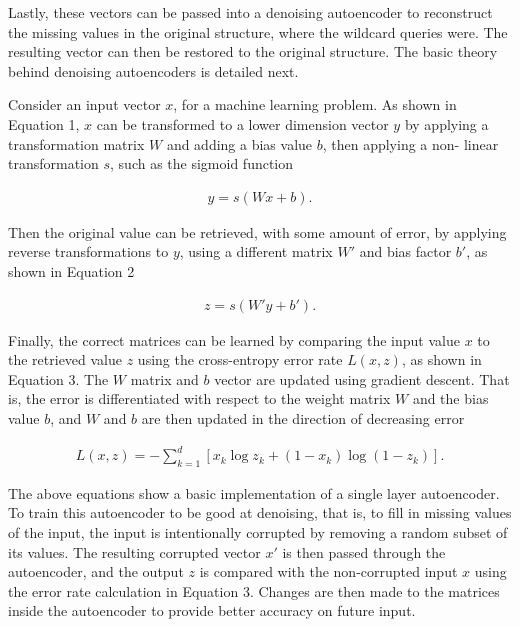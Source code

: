 \documentclass{sig-alternate}
\begin{document}
Lastly, these vectors can be passed into a denoising autoencoder to reconstruct the missing values
in the original structure, where the wildcard queries were. The resulting vector can then be restored
to the original structure. The basic theory behind denoising autoencoders is detailed next.

Consider an input vector $x$, for a machine learning problem.
As shown in Equation 1, $x$ can be transformed to a lower dimension
vector $y$ by applying a transformation matrix $W$ and adding a bias value $b$, then applying a non-
linear transformation $s$, such as the sigmoid function

\begin{gather}
y = s(Wx + b).
\end{gather}

Then the original value can be retrieved, with some amount of error, by applying reverse transformations to $y$,
using a different matrix $W'$ and bias factor $b'$, as shown in Equation 2

\begin{gather}
z = s(W' y  + b').
\end{gather}

Finally, the correct matrices can be learned by comparing the input value $x$ to the retrieved value $z$ 
using the cross-entropy error rate $L(x,z)$, as shown in Equation 3. The $W$ matrix and $b$ vector
are updated using gradient descent. That is, the error is differentiated
with respect to the weight matrix $W$ and the bias value $b$, and $W$ and $b$ are then updated in the
direction of decreasing error

\begin{gather}
L(x,z) = -\sum_{k=1}^d [x_k \log z_k + (1-x_k) \log(1-z_k)].
\end{gather}

The above equations show a basic implementation of a single layer autoencoder. To train this
autoencoder to be good at denoising, that is, to fill in missing values of the input, the input
is intentionally corrupted by removing a random subset of its values. The resulting corrupted
vector $x'$ is then passed through the autoencoder, and the output $z$ is compared with the
non-corrupted input $x$ using the error rate calculation in Equation 3. Changes are then made
to the matrices inside the autoencoder to provide better accuracy on future input.

\end{document}
